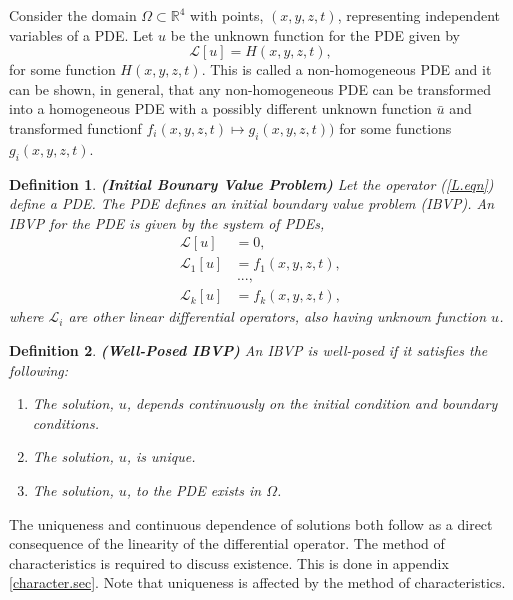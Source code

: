 \documentclass[12pt]{article}
\newtheorem{definition}{Definition}[section]
\theoremstyle{definition}
\numberwithin{equation}{section}
\begin{document}
{Consider the domain $\Omega\subset\mathbb{R}^4$ with points, $(x,y,z,t)$, representing independent variables of a PDE. Let $u$ be the unknown function for the PDE given by
\begin{equation}
\mathcal{L}[u]=H(x,y,z,t),
\label{L.eqn}
\end{equation}
for some function $H(x,y,z,t)$. This is called a non-homogeneous PDE and it can be shown, in general, that any non-homogeneous PDE can be transformed into a homogeneous PDE with a possibly different unknown function $\bar{u}$ and transformed functionf $f_i(x,y,z,t)\longmapsto g_i(x,y,z,t))$ for some functions $g_i(x,y,z,t)$.
\begin{definition}\textbf{(Initial Bounary Value Problem)}
Let the operator (\ref{L.eqn}) define a PDE. The PDE defines an initial boundary value problem (IBVP). An IBVP for the PDE is given by the system of PDEs,
\begin{align}
\mathcal{L}[u]&=0,\\\nonumber
\mathcal{L}_1[u]&=f_1(x,y,z,t),\\\nonumber&\,...,\\\nonumber \mathcal{L}_k[u]&=f_k(x,y,z,t),
\label{system.eqn}
\end{align}
where $\mathcal{L}_i$ are other linear differential operators, also having unknown function $u$.
\end{definition}
\begin{definition}\textbf{(Well-Posed IBVP)}
An IBVP is well-posed if it satisfies the following:
\begin{enumerate}
\item\label{posed3} The solution, $u$, depends continuously on the initial condition and boundary conditions.
\item\label{posed2} The solution, $u$, is unique.
\item\label{posed1} The solution, $u$, to the PDE exists in $\Omega$.
\end{enumerate}
\end{definition}
The uniqueness and continuous dependence of solutions both follow as a direct consequence of the linearity of the differential operator. The method of characteristics is required to discuss existence. This is done in appendix \ref{character.sec}. Note that uniqueness is affected by the method of characteristics. 

}
\end{document}
